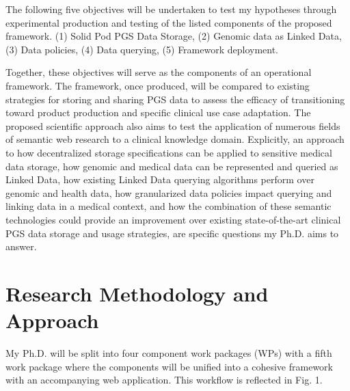 \documentclass[runningheads]{llncs}
\begin{document}
The following five objectives will be undertaken to test my hypotheses through experimental production and testing of the listed components of the proposed framework.
(1) Solid Pod PGS Data Storage, 
(2) Genomic data as Linked Data,
(3) Data policies,
(4) Data querying,
(5) Framework deployment.

Together, these objectives will serve as the components of an operational framework. 
The framework, once produced, will be compared to existing strategies for storing and sharing PGS data to assess the efficacy of transitioning toward product production and specific clinical use case adaptation.
The proposed scientific approach also aims to test the application of numerous fields of semantic web research to a clinical knowledge domain. 
Explicitly, an approach to how decentralized storage specifications can be applied to sensitive medical data storage, how genomic and medical data can be represented and queried as Linked Data, how existing Linked Data querying algorithms perform over genomic and health data, how granularized data policies impact querying and linking data in a medical context, and how the combination of these semantic technologies could provide an improvement over existing state-of-the-art clinical PGS data storage and usage strategies, are specific questions my Ph.D. aims to answer.


\section{Research Methodology and Approach}

My Ph.D. will be split into four component work packages (WPs) with a fifth work package where the components will be unified into a cohesive framework with an accompanying web application. This workflow is reflected in Fig. 1.
\end{document}

